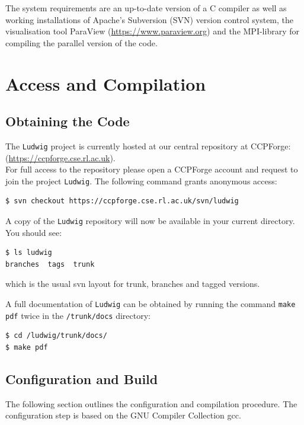 \documentclass[11pt,twoside,a4paper]{article}
\begin{document}
The system requirements are an up-to-date version of a C compiler as well as working installations 
of Apache's Subversion (SVN) version control system, the visualisation tool
ParaView (\hyperref[ParaView]{https://www.paraview.org}) and the MPI-library 
for compiling the parallel version of the code.

\section{Access and Compilation}

\subsection{Obtaining the Code}
\label{sec:getCode}

The \texttt{Ludwig} project is currently hosted at our central repository 
at CCPForge:\\
(\hyperref[CCPForge]{https://ccpforge.cse.rl.ac.uk}).\\
For full access to the repository please open a CCPForge account and request
to join the project \texttt{Ludwig}. The following command grants anonymous access:

\begin{lstlisting}[style=terminalverbatim]
$ svn checkout https://ccpforge.cse.rl.ac.uk/svn/ludwig
\end{lstlisting}

A copy of the \texttt{Ludwig} repository will now be available in your current directory. 
You should see:

\begin{lstlisting}
$ ls ludwig
branches  tags  trunk
\end{lstlisting}
which is the usual svn layout for trunk, branches and tagged versions.

A full documentation of \texttt{Ludwig} can be obtained by running 
the command \texttt{make pdf} twice in the \texttt{/trunk/docs} directory:

\begin{lstlisting}[style=terminalverbatim]
$ cd /ludwig/trunk/docs/
$ make pdf
\end{lstlisting}

\subsection{Configuration and Build}

The following section outlines the configuration and compilation 
procedure. The configuration step is based on the GNU Compiler Collection gcc.
\end{document}
